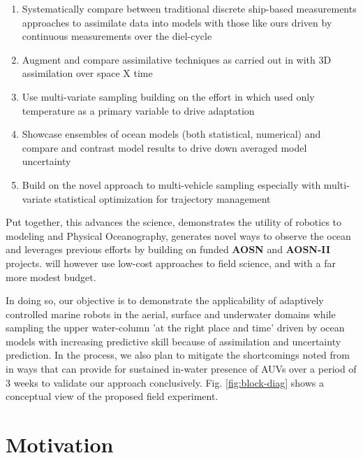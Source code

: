 \begin{enumerate}[noitemsep,topsep=5pt,parsep=0pt,partopsep=0pt,leftmargin=0.5cm]

\item Systematically compare between traditional discrete ship-based
  measurements approaches to assimilate data into models with those
  like ours driven by continuous measurements over the diel-cycle

\item Augment and compare assimilative techniques as carried out in
  \oldproj with 3D assimilation over space X time

\item Use multi-variate sampling building on the effort in \oldproj
  which used only temperature as a primary variable to drive
  adaptation 

\item Showcase ensembles of ocean models (both statistical, numerical) and
  compare and contrast model results to drive down averaged model
  uncertainty
  
\item Build on the novel approach to multi-vehicle sampling especially
  with multi-variate statistical optimization for trajectory
  management

\end{enumerate}  

Put together, this advances the science, demonstrates the utility of
robotics to modeling and Physical Oceanography, generates novel ways
to observe the ocean and leverages previous efforts by building on
\org funded \textbf{AOSN} \cite{aosn93} and \textbf{AOSN-II}
\cite{ramp09} projects. \proj will however use low-cost approaches to
field science, and with a far more modest budget.

In doing so, our objective is to demonstrate the applicability of
adaptively controlled marine robots in the aerial, surface and
underwater domains while sampling the upper water-column 'at the right
place and time' driven by ocean models with increasing predictive
skill because of assimilation and uncertainty prediction. In the
process, we also plan to mitigate the shortcomings noted from \oldproj
in ways that can provide for sustained in-water presence of AUVs over
a period of 3 weeks to validate our approach conclusively.
Fig. \ref{fig:block-diag} shows a conceptual view of the proposed
field experiment.

\section*{Motivation}


